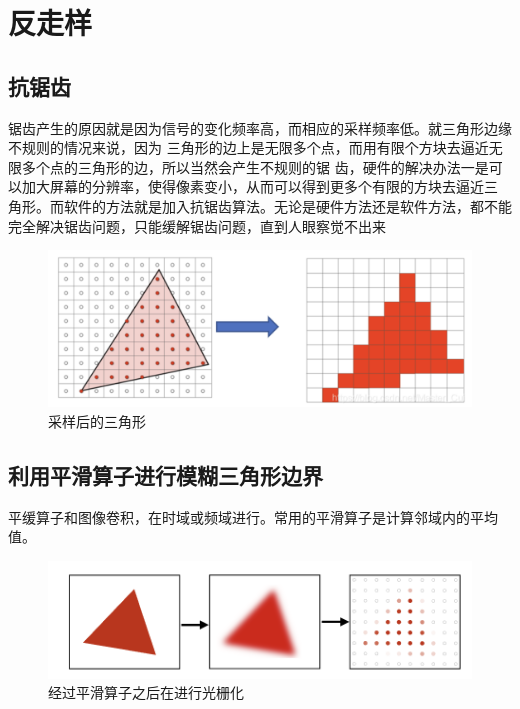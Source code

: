 \section{反走样}

\subsection*{抗锯齿}

锯齿产生的原因就是因为信号的变化频率高，而相应的采样频率低。就三角形边缘不规则的情况来说，因为
三角形的边上是无限多个点，而用有限个方块去逼近无限多个点的三角形的边，所以当然会产生不规则的锯
齿，硬件的解决办法一是可以加大屏幕的分辨率，使得像素变小，从而可以得到更多个有限的方块去逼近三
角形。而软件的方法就是加入抗锯齿算法。无论是硬件方法还是软件方法，都不能完全解决锯齿问题，只能缓解锯齿问题，直到人眼察觉不出来

\begin{figure}[H]
    \centering
    \includegraphics[scale=0.2]{figures/采样后的三角形.png}
    \caption{采样后的三角形}
\end{figure}

\subsection*{利用平滑算子进行模糊三角形边界}

平缓算子和图像卷积，在时域或频域进行。常用的平滑算子是计算邻域内的平均值。

\begin{figure}[H]
    \centering
    \includegraphics[scale=0.4]{figures/模糊算子.png}
    \caption{经过平滑算子之后在进行光栅化}
\end{figure}

